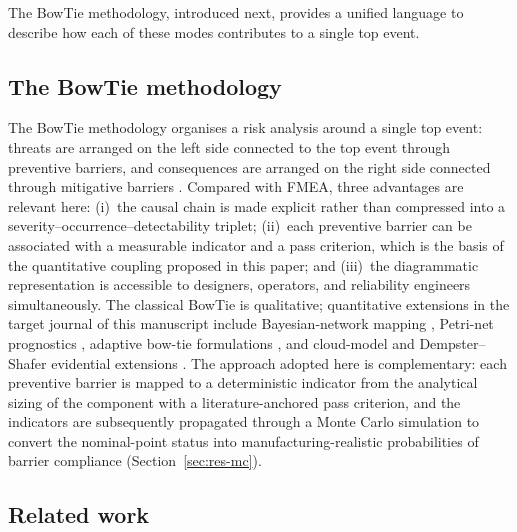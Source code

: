 The BowTie methodology, introduced next, provides a unified language
to describe how each of these modes contributes to a single top event.

\subsection{The BowTie methodology}\label{sec:bg-bowtie}

The BowTie methodology organises a risk analysis around a single top
event: threats are arranged on the left side connected to the top
event through preventive barriers, and consequences are arranged on
the right side connected through mitigative barriers
\citep{deruijter2016bowtiereview}. Compared with FMEA, three
advantages are relevant here: (i)~the causal chain is made explicit
rather than compressed into a severity--occurrence--detectability
triplet; (ii)~each preventive barrier can be associated with a
measurable indicator and a pass criterion, which is the basis of the
quantitative coupling proposed in this paper; and (iii)~the
diagrammatic representation is accessible to designers, operators,
and reliability engineers simultaneously. The classical BowTie is
qualitative; quantitative extensions in the target journal of this
manuscript include Bayesian-network mapping
\citep{khakzad2012ress,khakzad2013bowtiebayesian}, Petri-net
prognostics \citep{vileiniskis2017ressbowtie}, adaptive
bow-tie formulations \citep{talebberrouane2021ressabt}, and
cloud-model and Dempster--Shafer evidential extensions
\citep{xie2021ressbowtie,sezer2023ressbowtie}. The approach adopted
here is complementary: each preventive barrier is mapped to a
deterministic indicator from the analytical sizing of the component
with a literature-anchored pass criterion, and the indicators are
subsequently propagated through a Monte Carlo simulation to convert
the nominal-point status into manufacturing-realistic probabilities
of barrier compliance (Section~\ref{sec:res-mc}).

\subsection{Related work}\label{sec:bg-related}

